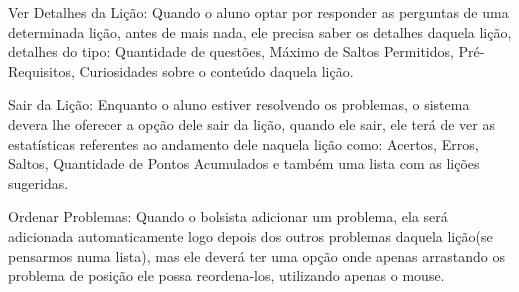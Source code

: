 \begin{alineascomponto}
	\item Ver Detalhes da Lição: Quando o aluno optar por responder as perguntas 
de uma determinada lição, antes de mais nada, ele precisa saber os detalhes 
daquela lição, detalhes do tipo: Quantidade de questões, Máximo de Saltos 
Permitidos, Pré-Requisitos, Curiosidades sobre o conteúdo daquela lição.

	\item Sair da Lição: Enquanto o aluno estiver resolvendo os problemas, o 
sistema devera lhe oferecer a opção dele sair da lição, quando ele sair, ele 
terá de ver as estatísticas referentes ao andamento dele naquela lição como: 
Acertos, Erros, Saltos, Quantidade de Pontos Acumulados e também uma lista com 
as lições sugeridas.
	
	\item Ordenar Problemas: Quando o bolsista adicionar um problema, ela será 
adicionada automaticamente logo depois dos outros problemas daquela lição(se 
pensarmos numa lista), mas ele deverá ter uma opção onde apenas arrastando 
os problema de posição ele possa reordena-los, utilizando apenas o mouse.

\end{alineascomponto}